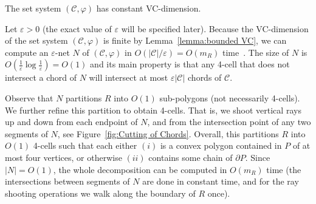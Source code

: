 \documentclass[a4paper,UKenglish]{lipics}
\newcommand{\m}{\ensuremath{m_{\scriptscriptstyle R}}}
\newcommand{\tcell}{4-cell\xspace}
\newcommand{\tcells}{4-cells\xspace}
\begin{document}
\begin{lemma}\label{lemma:bounded VC}
The set system $(\mathcal C, \varphi)$ has constant VC-dimension.
\end{lemma}

Let $\varepsilon >0$ (the exact value of $\varepsilon$ will be specified later).
Because the VC-dimension of the set system $(\mathcal C, \varphi)$ is finite by Lemma~\ref{lemma:bounded VC}, we can compute an $\varepsilon$-net $N$ of $(\mathcal C, \varphi)$ in $O(|\mathcal C|/\varepsilon) = O(\m)$ time~\cite{ConstructionEpsilonNets}. 
The size of $N$ is $O(\frac{1}{\varepsilon} \log \frac{1}{\varepsilon}) = O(1)$ and its main property is that any \tcell that does not intersect a chord of $N$ will intersect at most $\varepsilon |\mathcal C|$ chords of $\mathcal C$. 

Observe that $N$ partitions $R$ into $O(1)$ sub-polygons (not necessarily \tcells). We further refine this partition to obtain \tcells. That is, we shoot vertical rays up and down from each endpoint of $N$, and from the intersection point of  any two segments of $N$, see Figure~\ref{fig:Cutting of Chords}. Overall, this partitions $R$ into $O(1)$ \tcells such that each  either $(i)$  is a convex polygon contained in $P$ of at most four vertices, or otherwise $(ii)$ contains some chain of $\partial P$. 
Since $|N| = O(1)$, the whole decomposition can be computed in $O(\m)$ time (the intersections between segments of $N$ are done in constant time, and for the ray shooting operations we walk along the boundary of $R$ once).
\end{document}

